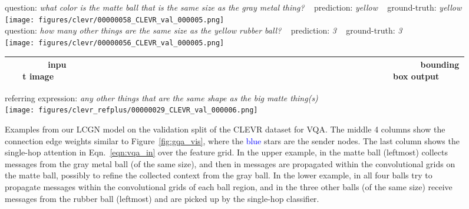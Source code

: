 \documentclass[10pt,twocolumn,letterpaper]{article}
\begin{document}
\begin{figure*}[t]
\vspace{1mm}

question: \textit{what color is the matte ball that is the same size as the gray metal thing?} ~
prediction: \textit{yellow} ~ ground-truth: \textit{yellow} \\
\texttt{[image: figures/clevr/00000058\_CLEVR\_val\_000005.png]} \\

question: \textit{how many other things are the same size as the yellow rubber ball?} ~ prediction: \textit{3} ~ ground-truth: \textit{3} \\
\texttt{[image: figures/clevr/00000056\_CLEVR\_val\_000005.png]} \\

\caption{Examples from our LCGN model on the validation split of the CLEVR dataset for VQA. The middle 4 columns show the connection edge weights  similar to Figure~\ref{fig:gqa_vis}, where the \textcolor{blue}{blue} stars are the sender nodes. The last column shows the single-hop attention  in Eqn.~\ref{eqn:vqa_in} over the  feature grid. In the upper example, in  the matte ball (leftmost) collects messages from the gray metal ball (of the same size), and then in  messages are propagated within the convolutional grids on the matte ball, possibly to refine the collected context from the gray ball. In the lower example, in  all four balls try to propagate messages within the convolutional grids of each ball region, and in  the three other balls (of the same size) receive messages from the rubber ball (leftmost) and are picked up by the single-hop classifier.}
\label{fig:clevr_vis}

\vspace{1em}

\centering
\small
\begin{tabularx}{\linewidth}{*{6}{c}}
~~~~~~~~input image & ~~~~~~~~~~~~~~~~~ & ~~~~~~~~~~~~~~~~~~~~~~~ & ~~~~~~~~~~~~~~~~~~~~~~ & ~~~~~~~~~~~~~~~~~~~~~~~ & ~~~~~~~~~~bounding box output \\
\hline
\end{tabularx}

\vspace{1mm}

referring expression: \textit{any other things that are the same shape as the big matte thing(s)} \\
\texttt{[image: figures/clevr\_refplus/00000029\_CLEVR\_val\_000006.png]} \\


\end{figure*}
\end{document}
